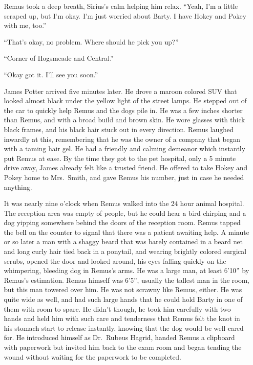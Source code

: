 \documentclass[12pt,twoside,openright]{memoir}
\begin{document}
Remus took a deep breath, Sirius's calm helping him relax. ``Yeah, I'm a little scraped up, but I'm okay. I'm just worried about Barty. I have Hokey and Pokey with me, too.''

``That's okay, no problem. Where should he pick you up?''

``Corner of Hogsmeade and Central.''

``Okay got it. I'll see you soon.''

James Potter arrived five minutes later. He drove a maroon colored SUV that looked almost black under the yellow light of the street lamps. He stepped out of the car to quickly help Remus and the dogs pile in. He was a few inches shorter than Remus, and with a broad build and brown skin. He wore glasses with thick black frames, and his black hair stuck out in every direction. Remus laughed inwardly at this, remembering that he was the owner of a company that began with a taming hair gel. He had a friendly and calming demeanor which instantly put Remus at ease. By the time they got to the pet hospital, only a 5 minute drive away, James already felt like a trusted friend. He offered to take Hokey and Pokey home to Mrs.\ Smith, and gave Remus his number, just in case he needed anything.

It was nearly nine o'clock when Remus walked into the 24 hour animal hospital. The reception area was empty of people, but he could hear a bird chirping and a dog yipping somewhere behind the doors of the reception room. Remus tapped the bell on the counter to signal that there was a patient awaiting help. A minute or so later a man with a shaggy beard that was barely contained in a beard net and long curly hair tied back in a ponytail, and wearing brightly colored surgical scrubs, opened the door and looked around, his eyes falling quickly on the whimpering, bleeding dog in Remus's arms. He was a large man, at least 6'10'' by Remus's estimation. Remus himself was 6'5'', usually the tallest man in the room, but this man towered over him. He was not scrawny like Remus, either. He was quite wide as well, and had such large hands that he could hold Barty in one of them with room to spare. He didn't though, he took him carefully with two hands and held him with such care and tenderness that Remus felt the knot in his stomach start to release instantly, knowing that the dog would be well cared for. He introduced himself as Dr.\ Rubeus Hagrid, handed Remus a clipboard with paperwork but invited him back to the exam room and began tending the wound without waiting for the paperwork to be completed.
\end{document}
